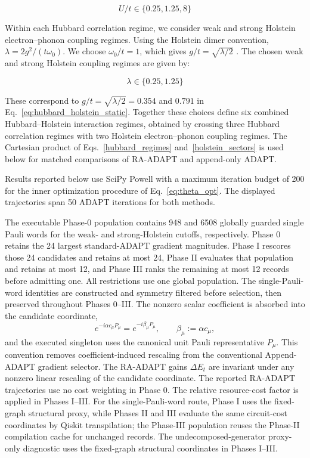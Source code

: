 \documentclass[
  reprint,
  amsmath,
  amssymb,
  aps,
  pra,
  nofootinbib,
  superscriptaddress,
  floatfix
]{revtex4-2}
\begin{document}
\begin{equation}
    U/t \in\{0.25,1.25,8\} \label{hubbard_regimes}
\end{equation}

Within each Hubbard correlation regime, we consider weak and strong Holstein electron--phonon coupling regimes. Using the Holstein dimer convention, \(\lambda=2g^2/(t\omega_0)\). We choose \(\omega_0/t=1\), which gives \(g/t=\sqrt{\lambda/2}\) \cite{Sakkinen2015HolsteinDimer}.
The chosen weak and strong Holstein coupling regimes are given by:

\begin{equation}
    \lambda\in\{0.25,1.25\} \label{holstein_sectors}
\end{equation}

These correspond to \(g/t=\sqrt{\lambda/2}=0.354\) and \(0.791\) in Eq.~\eqref{eq:hubbard_holstein_static}. Together these choices define six combined Hubbard--Holstein interaction regimes, obtained by crossing three Hubbard correlation regimes with two Holstein electron--phonon coupling regimes. The Cartesian product of Eqs.~\eqref{hubbard_regimes} and~\eqref{holstein_sectors} is used below for matched comparisons of RA-ADAPT and append-only ADAPT.


Results reported below use SciPy Powell with a maximum iteration budget of 200
for the inner optimization procedure of Eq.~\eqref{eq:theta_opt}. The displayed
trajectories span 50 ADAPT iterations for both methods.

The executable Phase-0 population contains 948 and 6508 globally guarded
single Pauli words for the weak- and strong-Holstein cutoffs, respectively.
Phase 0 retains the 24 largest standard-ADAPT gradient magnitudes. Phase I
rescores those 24 candidates and retains at most 24, Phase II evaluates that
population and retains at most 12, and Phase III ranks the remaining at most
12 records before admitting one. All restrictions use one global population.
The single-Pauli-word identities are constructed and symmetry filtered before
selection, then preserved throughout Phases 0--III.
The nonzero scalar coefficient is absorbed into the candidate coordinate,
\begin{equation*}
e^{-i\alpha c_\mu P_\mu}
=e^{-i\beta_\mu P_\mu},
\qquad
\beta_\mu:=\alpha c_\mu,
\end{equation*}
and the executed singleton uses the canonical unit Pauli representative \(P_\mu\).
This convention removes coefficient-induced rescaling from the conventional
Append-ADAPT gradient selector. The RA-ADAPT gains \(\Delta E_t\) are
invariant under any nonzero linear rescaling of the candidate coordinate.
The reported RA-ADAPT trajectories use no cost weighting in Phase 0. The
relative resource-cost factor is applied in Phases I--III. For the
single-Pauli-word route, Phase I uses the fixed-graph structural proxy, while
Phases II and III evaluate the same circuit-cost coordinates by Qiskit
transpilation; the Phase-III population reuses the Phase-II compilation cache
for unchanged records. The undecomposed-generator
proxy-only diagnostic uses the fixed-graph structural coordinates in Phases I--III.
\end{document}

